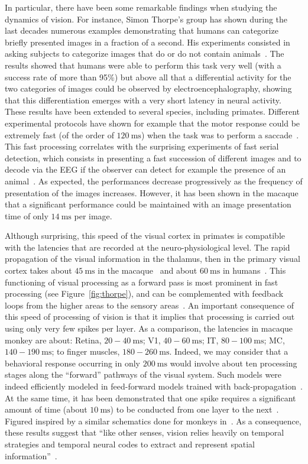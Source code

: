 \documentclass[brainsci, %
               review,submit,pdftex,moreauthors
               ]{Definitions/mdpi}
\newcommand{\ms}{\si{\milli\second}}%
\begin{document}
In particular, there have been some remarkable findings when studying the dynamics of vision. For instance, Simon Thorpe's group has shown during the last decades numerous examples demonstrating that humans can categorize briefly presented images in a fraction of a second. His experiments consisted in asking subjects to categorize images that do or do not contain animals~\citep{thorpe_speed_1996}. The results showed that humans were able to perform this task very well (with a success rate of more than 95\%) but above all that a differential activity for the two categories of images could be observed by electroencephalography, showing that this differentiation emerges with a very short latency in neural activity. These results have been extended to several species, including primates. Different experimental protocols have shown for example that the motor response could be extremely fast (of the order of $120~\ms$) when the task was to perform a saccade~\citep{kirchner_ultra-rapid_2006}. This fast processing correlates with the surprising experiments of fast serial detection, which consists in presenting a fast succession of different images and to decode via the EEG if the observer can detect for example the presence of an animal~\citep{keysers_speed_2001}. As expected, the performances decrease progressively as the frequency of presentation of the images increases. However, it has been shown in the macaque that a significant performance could be maintained with an image presentation time of only $14~\ms$ per image.

Although surprising, this speed of the visual cortex in primates is compatible with the latencies that are recorded at the neuro-physiological level. The rapid propagation of the visual information in the thalamus, then in the primary visual cortex takes about $45~\ms$ in the macaque~\citep{schmolesky_signal_1998} and about $60~\ms$ in humans~\citep{vanni_coinciding_2001}. This functioning of visual processing as a forward pass is most prominent in fast processing (see Figure~\ref{fig:thorpe}), and can be complemented with feedback loops from the higher areas to the sensory areas~\citep{lamme_distinct_2000}. An important consequence of this speed of processing of vision is that it implies that processing is carried out using only very few spikes per layer. As a comparison, the latencies in macaque monkey are about: Retina, $20-40~\ms$; V1, $40-60~\ms$; IT, $80-100~\ms$; MC, $140-190~\ms$; to finger muscles, $180-260~\ms$. Indeed, we may consider that a behavioral response occurring in only $200~\ms$ would involve about ten processing stages along the ``forward'' pathways of the visual system. Such models were indeed efficiently modeled in feed-forward models trained with back-propagation~\citep{serre_feedforward_2007,jeremie_ultrafast_2022}. At the same time, it has been demonstrated that one spike requires a significant amount of time (about $10~\ms$) to be conducted from one layer to the next~\citep{nowak_timing_1997,thorpe_seeking_2001}.  Figured inspired by a similar schematics done for monkeys in~\citep{thorpe_seeking_2001}. As a consequence, these results suggest that ``like other senses, vision relies heavily on temporal strategies and temporal neural codes to extract and represent spatial information''~\citep{rucci_temporal_2018}.
\end{document}
